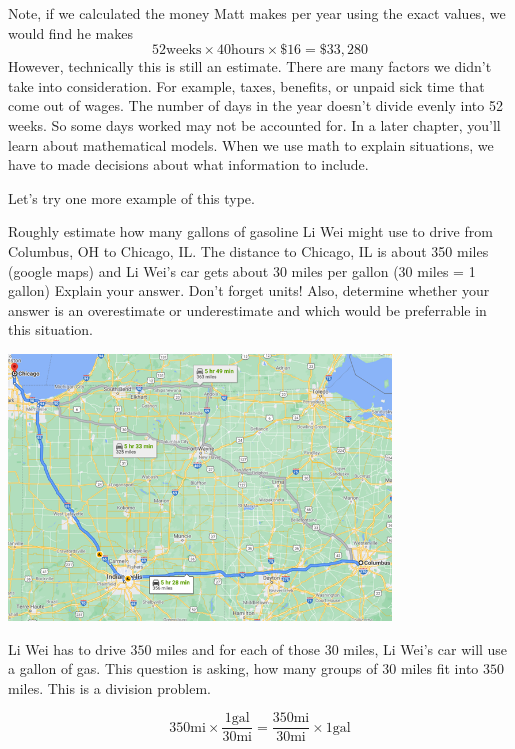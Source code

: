 \documentclass{ximera}
\begin{document}
\begin{MM}
Note, if we calculated the money Matt makes per year using the exact values, we would find he makes
$$52 \text{weeks} \times 40 \text{hours} \times \$16 =\$33,280$$ 
However, technically this is still an estimate. There are many factors we didn't take into consideration. For example, taxes, benefits, or unpaid sick time that come out of wages.  The number of days in the year doesn't divide evenly into 52 weeks. So some days worked may not be accounted for.  In a later chapter, you'll learn about mathematical models. When we use math to explain situations, we have to made decisions about what information to include.
\end{MM}

Let's try one more example of this type.

\begin{example}
Roughly estimate how many gallons of gasoline Li Wei might use to drive from Columbus, OH to Chicago, IL. The distance to Chicago, IL is about 350 miles (google maps) and Li Wei's car gets about 30 miles per gallon (30 miles = 1 gallon) Explain your answer. Don't forget units!  Also, determine whether your answer is an overestimate or underestimate and which would be preferrable in this situation.

\begin{image}
    \includegraphics[width=4in]{ColumbusChicago.png}
\end{image}

\begin{explanation}
Li Wei has to drive $350$ miles and for each of those $30$ miles, Li Wei's car will use a gallon of gas.  This question is asking, how many groups of $30$ miles fit into $350$ miles. This is a division problem. 

$$350 \text{mi} \times \frac{1 \text{gal}}{30 \text{mi}}=\frac{350 \text{mi}}{30 \text{mi}} \times{1 \text{gal}}  $$


\end{explanation}
\end{example}
\end{document}
